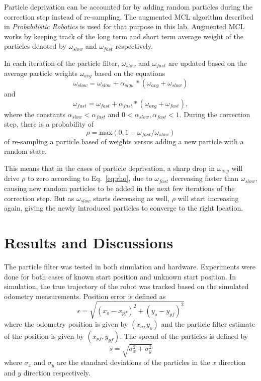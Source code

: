 \documentclass[conference]{../IEEEtran}
\begin{document}
Particle deprivation can be accounted for by adding random particles during the correction
step instead of re-sampling. The augmented MCL algorithm described in
\textit{Probabilistic Robotics} is used for that purpose in this lab. Augmented MCL works
by keeping track of the long term and short term average weight of the particles denoted
by $\omega_{slow}$ and $\omega_{fast}$ respectively.

In each iteration of the particle filter, $\omega_{slow}$ and $\omega_{fast}$ are updated
based on the average particle weights $\omega_{avg}$ based on the equations
\begin{equation}
  \omega_{slow} = \omega_{slow} + \alpha_{slow} * (\omega_{avg} + \omega_{slow})
  \label{eq:sh_term}
\end{equation}
and
\begin{equation}
  \omega_{fast} = \omega_{fast} + \alpha_{fast} * (\omega_{avg} + \omega_{fast})
  \label{eq:lo_term},
\end{equation}
where the constants $\alpha_{slow} < \alpha_{fast}$ and $0 < \alpha_{slow},
\alpha_{fast} < 1$. During the correction step, there is a probability of
\begin{equation}
  \rho = \text{max}(0, 1- \omega_{fast} / \omega_{slow})
  \label{eq:rho}
\end{equation}
of re-sampling a particle based of weights versus adding a new particle with a random
state.

This means that in the cases of particle deprivation, a sharp drop in $\omega_{avg}$ will
drive $\rho$ to zero according to Eq.~\ref{eq:rho}, due to $\omega_{fast}$ decreasing
faster than $\omega_{slow}$, causing new random particles to be added in the next few
iterations of the correction step. But as $\omega_{slow}$ starts decreasing as well,
$\rho$ will start increasing again, giving the newly introduced particles to converge to
the right location.

\section{Results and Discussions}
The particle filter was tested in both simulation and hardware.  Experiments were done for
both cases of known start position and unknown start position. In simulation, the true
trajectory of the robot was tracked based on the simulated odometry measurements.
Position error is defined as
\begin{equation}
  \epsilon = \sqrt{(x_o-x_{pf})^2+(y_o-y_{pf})^2}
\end{equation}
where the odometry position is given by $(x_o,y_o)$ and the particle filter estimate of
the position is given by $(x_{pf},y_{pf})$. The spread of the particles is defined by
\begin{equation}
  s = \sqrt{\sigma_x^2+\sigma_y^2}
\end{equation}
where $\sigma_x$ and $\sigma_y$ are the standard deviations of the particles in the $x$
direction and $y$ direction respectively.
\end{document}
